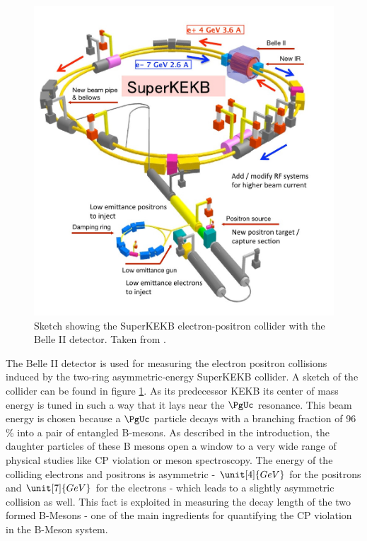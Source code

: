 \begin{figure}
 \centering
 \includegraphics[height=0.4\textheight]{figures/experimental_setup/superkekb.jpg}
 \caption[Sketch showing the SuperKEKB electron-positron collider.]{Sketch showing the SuperKEKB electron-positron collider with the Belle II detector. Taken from \cite{DesyWebseite}.}
 \label{fig-superkekb}
\end{figure}


The Belle II detector is used for measuring the electron positron collisions induced by the two-ring asymmetric-energy SuperKEKB collider. A sketch of the collider can be found in figure \ref{fig-superkekb}. As its predecessor KEKB its center of mass energy is tuned in such a way that it lays near the $\PgUc$ resonance. This beam energy is chosen because a $\PgUc$ particle decays with a branching fraction of 96 \% into a pair of entangled B-mesons. As described in the introduction, the daughter particles of these B mesons open a window to a very wide range of physical studies like CP violation or meson spectroscopy. The energy of the colliding electrons and positrons is asymmetric - $\unit[4]{GeV}$ for the positrons and $\unit[7]{GeV}$ for the electrons - which leads to a slightly asymmetric collision as well. This fact is exploited in measuring the decay length of the two formed B-Mesons - one of the main ingredients for quantifying the CP violation in the B-Meson system. 

